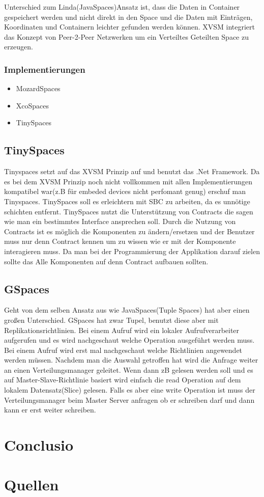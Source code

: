 \documentclass[a4paper,12pt]{scrreprt}
\begin{document}
		
		Unterschied zum Linda(JavaSpaces)Ansatz ist, dass die Daten in Container gespeichert werden und nicht direkt in den Space und die Daten mit Einträgen, Koordinaten und Containern leichter gefunden werden können.
		XVSM integriert das Konzept von Peer-2-Peer Netzwerken um ein Verteiltes Geteilten Space zu erzeugen.
		
		\subsection{Implementierungen}
			\begin{itemize}
				\item MozardSpaces
				\item XcoSpaces
				\item TinySpaces
			\end{itemize}
		
		
		\section{TinySpaces}
			Tinyspaces setzt auf das XVSM Prinzip auf und benutzt das .Net Framework. Da es bei dem XVSM Prinzip noch nicht vollkommen mit allen Implementierungen kompatibel war(z.B für embeded devices nicht perfomant genug) erschuf man Tinyspaces. 
			TinySpaces soll es erleichtern mit SBC zu arbeiten, da es unnötige schichten entfernt. 
			TinySpaces nutzt die Unterstützung von Contracts die sagen wie man ein bestimmtes Interface ansprechen soll.
			Durch die Nutzung von Contracts ist es möglich die Komponenten zu ändern/ersetzen und der Benutzer muss nur denn Contract kennen um zu wissen wie er mit der Komponente interagieren muss. Da man bei der Programmierung der Applikation darauf zielen sollte das Alle Komponenten auf denn Contract aufbauen sollten.\\
		
		\section{GSpaces}
		Geht von dem selben Ansatz aus wie JavaSpaces(Tuple Spaces) hat aber einen großen Unterschied. GSpaces hat zwar Tupel, benutzt diese aber mit Replikationsrichtlinien.  Bei einem Aufruf wird ein lokaler Aufrufverarbeiter aufgerufen und es wird nachgeschaut welche Operation ausgeführt werden muss. Bei  einem Aufruf wird erst mal nachgeschaut welche Richtlinien angewendet werden müssen. Nachdem man die Auswahl getroffen hat wird die Anfrage weiter an einen Verteilungsmanager geleitet.  Wenn dann zB gelesen werden soll und es auf Master-Slave-Richtlinie basiert wird einfach die read Operation auf dem lokalem Datensatz(Slice) gelesen. Falls es aber eine write Operation ist muss der Verteilungsmanager beim Master Server anfragen ob er schreiben darf und dann kann er erst weiter schreiben.	
	
\chapter{Conclusio}

\chapter{Quellen}
\end{document}

